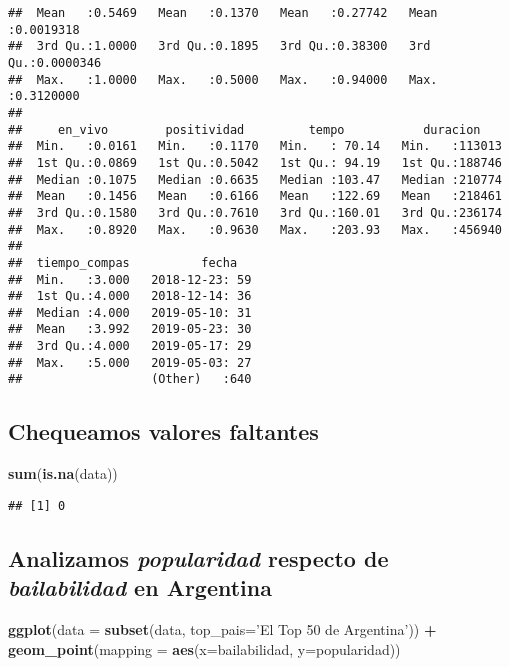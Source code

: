 \documentclass[]{article}
\newenvironment{Shaded}{\begin{snugshade}}{\end{snugshade}}
\newcommand{\KeywordTok}[1]{\textcolor[rgb]{0.13,0.29,0.53}{\textbf{#1}}}
\newcommand{\DataTypeTok}[1]{\textcolor[rgb]{0.13,0.29,0.53}{#1}}
\newcommand{\StringTok}[1]{\textcolor[rgb]{0.31,0.60,0.02}{#1}}
\newcommand{\OperatorTok}[1]{\textcolor[rgb]{0.81,0.36,0.00}{\textbf{#1}}}
\newcommand{\NormalTok}[1]{#1}
\begin{document}
\begin{verbatim}
##  Mean   :0.5469   Mean   :0.1370   Mean   :0.27742   Mean   :0.0019318  
##  3rd Qu.:1.0000   3rd Qu.:0.1895   3rd Qu.:0.38300   3rd Qu.:0.0000346  
##  Max.   :1.0000   Max.   :0.5000   Max.   :0.94000   Max.   :0.3120000  
##                                                                         
##     en_vivo        positividad         tempo           duracion     
##  Min.   :0.0161   Min.   :0.1170   Min.   : 70.14   Min.   :113013  
##  1st Qu.:0.0869   1st Qu.:0.5042   1st Qu.: 94.19   1st Qu.:188746  
##  Median :0.1075   Median :0.6635   Median :103.47   Median :210774  
##  Mean   :0.1456   Mean   :0.6166   Mean   :122.69   Mean   :218461  
##  3rd Qu.:0.1580   3rd Qu.:0.7610   3rd Qu.:160.01   3rd Qu.:236174  
##  Max.   :0.8920   Max.   :0.9630   Max.   :203.93   Max.   :456940  
##                                                                     
##  tiempo_compas          fecha    
##  Min.   :3.000   2018-12-23: 59  
##  1st Qu.:4.000   2018-12-14: 36  
##  Median :4.000   2019-05-10: 31  
##  Mean   :3.992   2019-05-23: 30  
##  3rd Qu.:4.000   2019-05-17: 29  
##  Max.   :5.000   2019-05-03: 27  
##                  (Other)   :640
\end{verbatim}

\subsection{Chequeamos valores
faltantes}\label{chequeamos-valores-faltantes}

\begin{Shaded}
\begin{Highlighting}[]
\KeywordTok{sum}\NormalTok{(}\KeywordTok{is.na}\NormalTok{(data))}
\end{Highlighting}
\end{Shaded}

\begin{verbatim}
## [1] 0
\end{verbatim}

\subsection{\texorpdfstring{Analizamos \emph{popularidad} respecto de
\emph{bailabilidad} en
Argentina}{Analizamos popularidad respecto de bailabilidad en Argentina}}\label{analizamos-popularidad-respecto-de-bailabilidad-en-argentina}

\begin{Shaded}
\begin{Highlighting}[]
\KeywordTok{ggplot}\NormalTok{(}\DataTypeTok{data =} \KeywordTok{subset}\NormalTok{(data, }\DataTypeTok{top_pais=}\StringTok{'El Top 50 de Argentina'}\NormalTok{)) }\OperatorTok{+}
\StringTok{  }\KeywordTok{geom_point}\NormalTok{(}\DataTypeTok{mapping =} \KeywordTok{aes}\NormalTok{(}\DataTypeTok{x=}\NormalTok{bailabilidad, }\DataTypeTok{y=}\NormalTok{popularidad))}
\end{Highlighting}
\end{Shaded}
\end{document}
